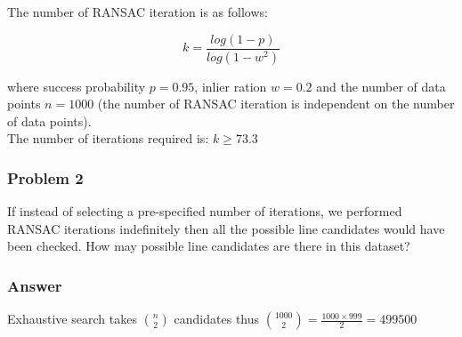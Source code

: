 \documentclass[12pt]{article}
\begin{document}
The number of RANSAC iteration is as follows:

\begin{equation}
	k = \frac{log (1 - p)}{log (1 - w^2)} 
\end{equation}

\noindent where success probability $p = 0.95$, inlier ration $w = 0.2$ and the number of data points $n = 1000$ (the number of RANSAC iteration is independent on the number of data points). \\

\noindent The number of iterations required is: $k \geq 73.3$

\pagebreak

\subsubsection*{Problem 2}

If instead of selecting a pre-specified number of iterations, we performed RANSAC iterations indefinitely then all the possible line candidates would have been checked. How may possible line candidates are there in this dataset?

\subsubsection*{Answer}

Exhaustive search takes ${{n}\choose{2}}$ candidates thus ${{1000}\choose{2}} = \frac{1000 \times 999}{2} = 499500$ 
\end{document}
